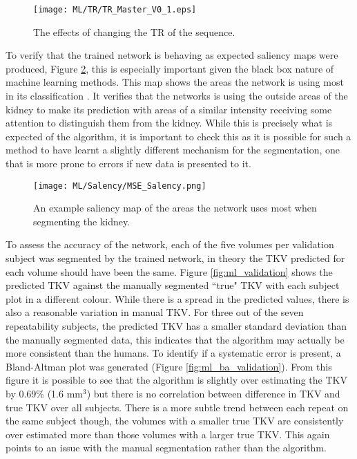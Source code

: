 \begin{figure}[H]
	\centering
	\texttt{[image: ML/TR/TR\_Master\_V0\_1.eps]}
	\caption{The effects of changing the \ac{TR} of the sequence.}
	\label{fig:ml_tr}	
\end{figure}

To verify that the trained network is behaving as expected saliency maps were produced, Figure \ref{fig:ml_salency}, this is especially important given the black box nature of machine learning methods. This map shows the areas the network is using most in its classification \cite{mahapatra_visual_2016}. It verifies that the networks is using the outside areas of the kidney to make its prediction with areas of a similar intensity receiving some attention to distinguish them from the kidney. While this is precisely what is expected of the algorithm, it is important to check this as it is possible for such a method to have learnt a slightly different mechanism for the segmentation, one that is more prone to errors if new data is presented to it.

\begin{figure}[H]
	\centering
	\texttt{[image: ML/Salency/MSE\_Salency.png]}
	\caption{An example saliency map of the areas the network uses most when segmenting the kidney.}
	\label{fig:ml_salency}	
\end{figure}

To assess the accuracy of the network, each of the five volumes per validation subject was segmented by the trained network, in theory the \ac{TKV} predicted for each volume should have been the same. Figure \ref{fig:ml_validation} shows the predicted \ac{TKV} against the manually segmented ``true" \ac{TKV} with each subject plot in a different colour. While there is a spread in the predicted values, there is also a reasonable variation in manual \ac{TKV}. For three out of the seven repeatability subjects, the predicted \ac{TKV} has a smaller standard deviation than the manually segmented data, this indicates that the algorithm may actually be more consistent than the humans. To identify if a systematic error is present, a Bland-Altman plot was generated (Figure \ref{fig:ml_ba_validation}). From this figure it is possible to see that the algorithm is slightly over estimating the \ac{TKV} by 0.69\% (1.6 mm$^3$) but there is no correlation between difference in \ac{TKV} and true \ac{TKV} over all subjects. There is a more subtle trend between each repeat on the same subject though, the volumes with a smaller true \ac{TKV} are consistently over estimated more than those volumes with a larger true \ac{TKV}. This again points to an issue with the manual segmentation rather than the algorithm.

